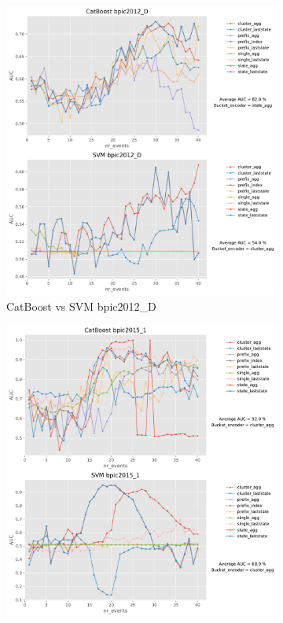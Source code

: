 \documentclass[twoside,11pt]{Latex/Classes/PhDthesisPSnPDF}
\begin{document}
\begin{figure}[t!] %
	
	\begin{subfigure}{0.48\textwidth}
		\includegraphics[width=\linewidth]{images/catboost/graphssvm/bpic2012_D_CatBoost_svm.pdf}
		\caption{CatBoost vs SVM bpic2012\_D} \label{fig:b12dcs}
	\end{subfigure}\hspace*{\fill}
	\begin{subfigure}{0.48\textwidth}
		\includegraphics[width=\linewidth]{images/catboost/graphssvm/bpic2015_1_CatBoost_svm.pdf}

\end{subfigure}
\end{figure}
\end{document}
